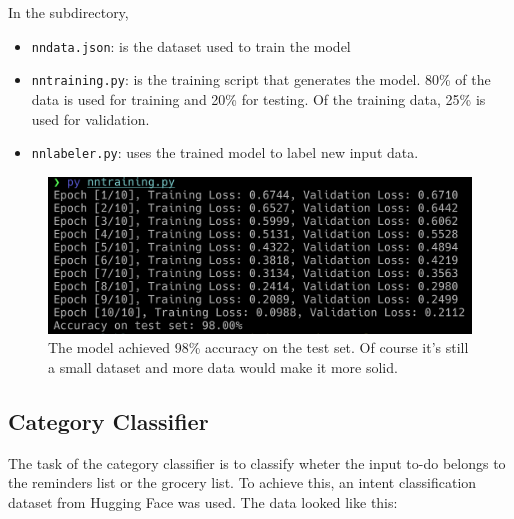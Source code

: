 \documentclass{article}
\begin{document}
In the subdirectory,
\begin{itemize}
 \item \texttt{nndata.json}: is the dataset used to train the model
  \item \texttt{nntraining.py}: is the training script that generates the model. 80\% of the data is used for training and 20\% for testing. Of the training data, 25\% is used for validation.
  \item \texttt{nnlabeler.py}: uses the trained model to label new input data.
\end{itemize}

\begin{figure}[htbp]
\centering
\includegraphics[width=\textwidth]{question_classifier_accuracy.png}
\caption{\small The model achieved 98\% accuracy on the test set. Of course it's still a small dataset and more data would make it more solid.}
\end{figure}

\subsection*{\color{draculayellow}Category Classifier}

The task of the category classifier is to classify wheter the input to-do belongs to the reminders list or the grocery list. To achieve this, an intent classification dataset from Hugging Face was used. The data looked like this:
\end{document}
